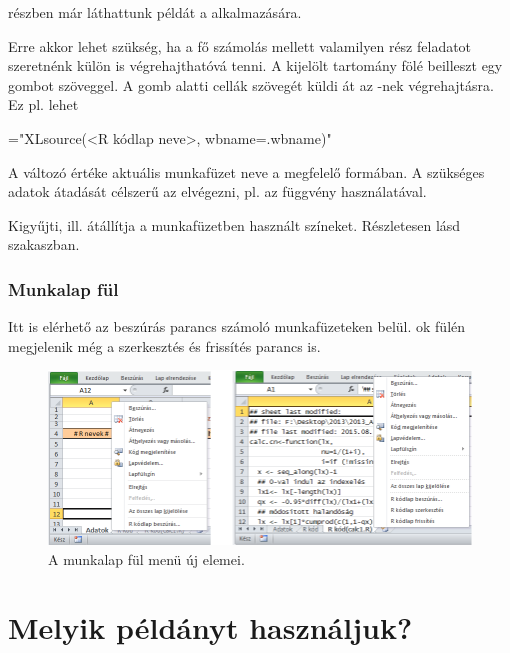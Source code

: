 \begin{description}
\begin{description}
   
    {%
      } részben már
    láthattunk példát a  alkalmazására.
  \item[\code{Run button}] Erre  akkor lehet szükség, ha a fő számolás
    mellett valamilyen rész 
    feladatot szeretnénk külön is végrehajthatóvá tenni.  A kijelölt
    tartomány fölé beilleszt egy gombot  szöveggel. A
    gomb alatti cellák szövegét küldi át az -nek végrehajtásra. Ez
    pl. lehet
\begin{VBAframe}
="XLsource(<R kódlap neve>, wbname=.wbname)"
\end{VBAframe}
    A   változó értéke 
    aktuális munkafüzet neve a megfelelő formában. A szükséges adatok
    átadását célszerű az  elvégezni, pl. az 
    függvény használatával.
  \end{description}
\item[\code{Used colors, Change colors}] Kigyűjti,
  ill. átállítja a munkafüzetben használt színeket. Részletesen lásd
   szakaszban.
\end{description}
\subsubsection{Munkalap fül}

 Itt is elérhető az  beszúrás parancs számoló
 munkafüzeteken belül.  ok fülén megjelenik még a
 szerkesztés és frissítés parancs is.

\begin{figure}[h]
  \centering
  \includegraphics{images/ply_menu}
  \caption{A munkalap fül menü új elemei.}
  \label{fig:3.2a}
\end{figure}

\section{Melyik  példányt használjuk?}
\label{sec:3.2}

